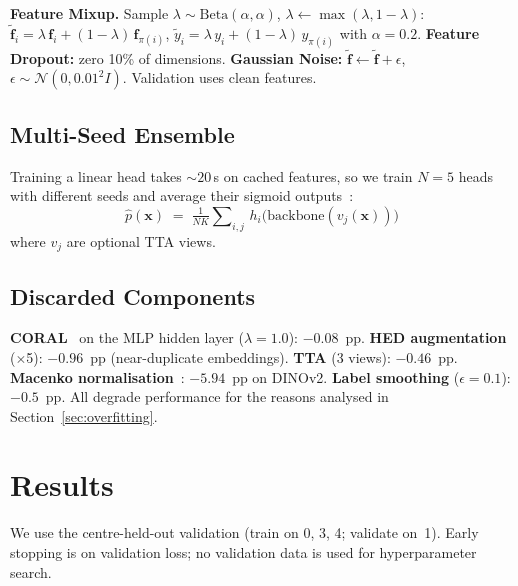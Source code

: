 \documentclass{midl}
\begin{document}
\textbf{Feature Mixup.} Sample $\lambda \sim \text{Beta}(\alpha, \alpha)$, $\lambda \gets \max(\lambda, 1{-}\lambda)$:
$\tilde{\mathbf{f}}_i = \lambda\,\mathbf{f}_i + (1{-}\lambda)\,\mathbf{f}_{\pi(i)}$, \;
$\tilde{y}_i = \lambda\,y_i + (1{-}\lambda)\,y_{\pi(i)}$
with $\alpha = 0.2$.
\textbf{Feature Dropout:} zero 10\% of dimensions.
\textbf{Gaussian Noise:} $\tilde{\mathbf{f}} \gets \tilde{\mathbf{f}} + \epsilon$, $\epsilon \sim \mathcal{N}(0, 0.01^2 I)$.
Validation uses clean features.

\subsection{Multi-Seed Ensemble}
\label{sec:ensemble}

Training a linear head takes ${\sim}20$\,s on cached features, so we train $N{=}5$ heads with different seeds and average their sigmoid outputs~\citep{wortsman2022model}:
\[
\hat{p}(\mathbf{x}) \;=\; \tfrac{1}{NK} \sum\nolimits_{i,j}\, h_i\!\bigl(\mathrm{backbone}(v_j(\mathbf{x}))\bigr)
\]
where $v_j$ are optional TTA views.

\subsection{Discarded Components}

\textbf{CORAL}~\citep{sun2016deep} on the MLP hidden layer ($\lambda{=}1.0$): $-0.08$~pp.
\textbf{HED augmentation} ($\times$5): $-0.96$~pp (near-duplicate embeddings).
\textbf{TTA} (3 views): $-0.46$~pp.
\textbf{Macenko normalisation}~\citep{macenko2009method}: $-5.94$~pp on DINOv2.
\textbf{Label smoothing} ($\epsilon{=}0.1$): $-0.5$~pp.
All degrade performance for the reasons analysed in Section~\ref{sec:overfitting}.

\section{Results}
\label{sec:results}

We use the centre-held-out validation (train on 0, 3, 4; validate on~1). Early stopping is on validation loss; no validation data is used for hyperparameter search.
\end{document}
